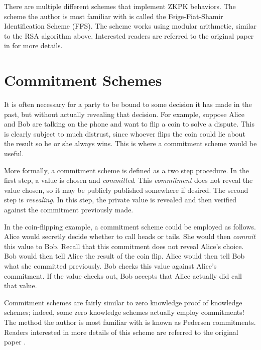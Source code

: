 There are multiple different schemes that implement ZKPK behaviors. 
The scheme the author is most familiar with is called the Feige-Fiat-Shamir Identification Scheme (FFS). 
The scheme works using modular arithmetic, similar to the RSA algorithm above.
Interested readers are referred to the original paper in \cite{ffs} for more details. 

\section{Commitment Schemes}
It is often necessary for a party to be bound to some decision it has made in the past, but without
actually revealing that decision. For example, suppose Alice and Bob are talking on the phone and
want to flip a coin to solve a dispute. This is clearly subject to much distrust, since whoever flips the
coin could lie about the result so he or she always wins.
This is where a commitment scheme would be useful.

More formally, a commitment scheme is defined as a two step procedure. In the first step, a value
is chosen and \textit{committed}. This \textit{commitment} does not reveal the value chosen, so it
may be publicly published somewhere if desired. The second step is \textit{revealing}. In this step,
the private value is revealed and then verified against the commitment previously made.

In the coin-flipping example, a commitment scheme could be employed as follows. Alice would 
secretly decide whether to call heads or tails. She would then \textit{commit} this value to Bob. Recall
that this commitment does not reveal Alice's choice. Bob would then tell Alice the result of the coin
flip. Alice would then tell Bob what she committed previously. Bob checks this value against Alice's
commitment. If the value checks out, Bob accepts that Alice actually did call that value.

Commitment schemes are fairly similar to zero knowledge proof of knowledge schemes; indeed, some
zero knowledge schemes actually employ commitments! The method the author is most familiar with
is known as Pedersen commitments. Readers interested in more details of this scheme are referred
to the original paper \cite{pedersen}.

